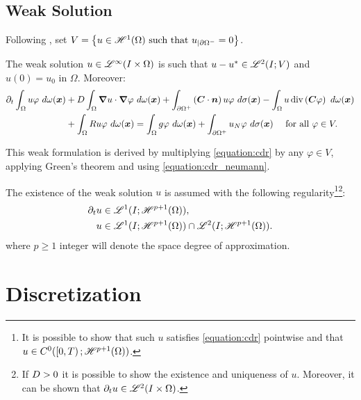 \newpage
\subsection{Weak Solution}

Following \cite{Feistauer2004}, set $V = \left\{ u \in \mathscr{H}^{1}(\Omega) \text{ such that } u_{\mid \partial \Omega^-} = 0 \right\}$.

\begin{definition}
    The weak solution $u \in \mathscr{L}^{\infty}(I \times \Omega)$ is such that $u - u^* \in \mathscr{L}^{2}(I; V)$ and $u(0) = u_0$ in $\Omega$. Moreover:
    \begin{align}
        \partial_t \int_{\Omega} u \varphi ~ d \omega(\bm{x}) &+ D \int_{\Omega} \bm{\nabla} u \cdot \bm{\nabla} \varphi ~ d \omega(\bm{x}) + \int_{\partial \Omega^+} \left( \bm{C} \cdot \bm{n} \right) u \varphi ~ d \sigma(\bm{x}) - \int_{\Omega} u \operatorname*{div} \left( \bm{C} \varphi \right) ~ d \omega(\bm{x}) \notag \\
        &+ \int_{\Omega} R u \varphi ~ d \omega(\bm{x}) = \int_{\Omega} g \varphi ~ d \omega(\bm{x}) + \int_{\partial \Omega^+} u_N \varphi ~ d \sigma(\bm{x}) \quad \text{ for all } \varphi \in V.
    \end{align}
\end{definition}
This weak formulation is derived by multiplying \eqref{equation:cdr} by any $\varphi \in V$, applying Green's theorem and using \eqref{equation:cdr_neumann}. %

The existence of the weak solution $u$ is assumed with the following regularity\footnote{It is possible to show that such $u$ satisfies \eqref{equation:cdr} pointwise and that $u \in C^0(\left[ 0, T \right); \mathscr{H}^{p + 1}(\Omega))$.}\footnote{If $D > 0$ it is possible to show the existence and uniqueness of $u$. Moreover, it can be shown that $\partial_t u \in \mathscr{L}^{2}(I \times \Omega)$.}: %
\begin{align}
    \partial_t u & \in \mathscr{L}^{1}(I; \mathscr{H}^{p + 1}(\Omega)), \label{equation:assumption_regularity_1} \\
    u & \in \mathscr{L}^{1}(I; \mathscr{H}^{p + 1}(\Omega)) \cap \mathscr{L}^{2}(I; \mathscr{H}^{p + 1}(\Omega)). \label{equation:assumption_regularity_2}
\end{align}
where $p \geq 1$ integer will denote the space degree of approximation.

\newpage
\section{Discretization}


